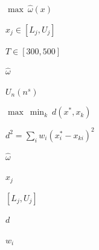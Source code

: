 
$\max\ \hat\omega(x)$

$x_j\in[L_j,U_j]$

$T\in[300,500]$

$\hat\omega$

$U_n(n^s)$

$\max\ \min_k\ d(x^*,x_k)$

$d^2=\sum_i w_i(x_i^*-x_{ki})^2$

$\hat\omega$

$x_j$

$[L_j,U_j]$

$d$

$w_i$
